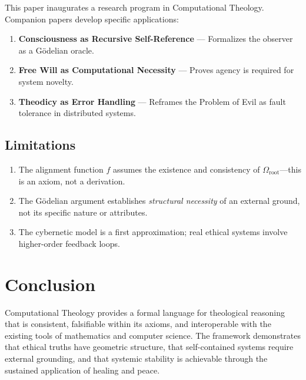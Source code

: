 \documentclass[12pt, a4paper]{article}
\theoremstyle{plain}
\theoremstyle{definition}
\begin{document}
This paper inaugurates a research program in Computational Theology. Companion
papers develop specific applications:
\begin{enumerate}
  \item \textbf{Consciousness as Recursive Self-Reference} --- Formalizes
    the observer as a G\"odelian oracle.
  \item \textbf{Free Will as Computational Necessity} --- Proves agency
    is required for system novelty.
  \item \textbf{Theodicy as Error Handling} --- Reframes the Problem of
    Evil as fault tolerance in distributed systems.
\end{enumerate}

\subsection{Limitations}
\begin{enumerate}
  \item The alignment function $f$ assumes the existence and consistency
    of $\Omega_{\text{root}}$---this is an axiom, not a derivation.
  \item The G\"odelian argument establishes \emph{structural necessity}
    of an external ground, not its specific nature or attributes.
  \item The cybernetic model is a first approximation; real ethical
    systems involve higher-order feedback loops.
\end{enumerate}

\section{Conclusion}\label{sec:conclusion}

Computational Theology provides a formal language for theological reasoning
that is consistent, falsifiable within its axioms, and interoperable with
the existing tools of mathematics and computer science. The framework
demonstrates that ethical truths have geometric structure, that self-contained
systems require external grounding, and that systemic stability is achievable
through the sustained application of healing and peace.


\vspace{2em}
\noindent\hrulefill
\vspace{1em}







\vspace{3em}
\noindent\hrulefill
\vspace{1em}
\end{document}
